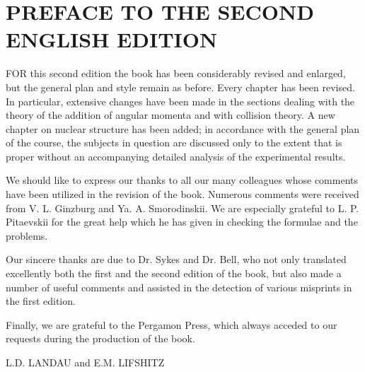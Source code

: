 \chapter{PREFACE TO THE SECOND ENGLISH EDITION}
FOR this second edition the book has been considerably revised and enlarged, but the general plan and style remain as before. Every chapter has been revised. In particular, extensive changes have been made in the sections dealing with the theory of the addition of angular momenta and with collision theory. A new chapter on nuclear structure has been added; in accordance with the general plan of the course, the subjects in question are discussed only to the extent that is proper without an accompanying detailed analysis of the experimental results.

We should like to express our thanks to all our many colleagues whose comments have been utilized in the revision of the book. Numerous comments were received from V. L. Ginzburg and Ya. A. Smorodinskii. We are especially grateful to L. P. Pitaevskii for the great help which he has given in checking the formulae and the problems.

Our sincere thanks are due to Dr. Sykes and Dr. Bell, who not only translated excellently both the first and the second edition of the book, but also made a number of useful comments and assisted in the detection of various misprints in the first edition.

Finally, we are grateful to the Pergamon Press, which always acceded to our requests during the production of the book.


\vspace{4ex}
\noindent L.D. LANDAU and E.M. LIFSHITZ


\noindent\date{October 1964}